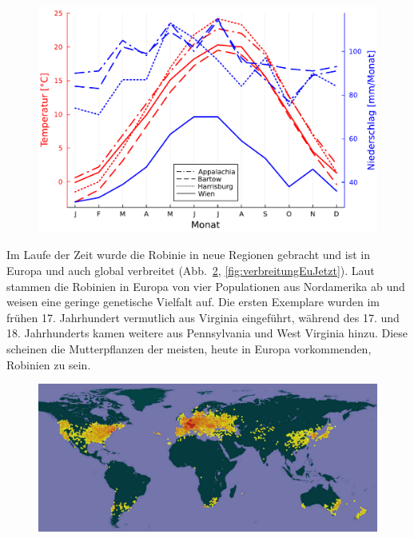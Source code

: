 \documentclass[twocolumn]{scrartcl}
\begin{document}
\begin{figure}[htbp]
  \centering
  \includegraphics[width=.9\linewidth]{./bild/wetter}
  \label{fig:wetter}
\end{figure}

Im Laufe der Zeit wurde die Robinie in neue Regionen gebracht und ist in Europa und auch global verbreitet (Abb.~\ref{fig:verbreitungGlob}, \ref{fig:verbreitungEuJetzt}). Laut \citet{bouteiller2019robinie} stammen die Robinien in Europa von vier Populationen aus Nordamerika ab und weisen eine geringe genetische Vielfalt auf. Die ersten Exemplare wurden im frühen 17. Jahrhundert vermutlich aus Virginia eingeführt, während des 17. und 18. Jahrhunderts kamen weitere aus Pennsylvania und West Virginia hinzu. Diese scheinen die Mutterpflanzen der meisten, heute in Europa vorkommenden, Robinien zu sein.

\begin{figure}[htbp]
  \centering
  \includegraphics[width=.9\linewidth]{./bild/verbreitungRobGlob}
  \label{fig:verbreitungGlob}
\end{figure}
\end{document}
